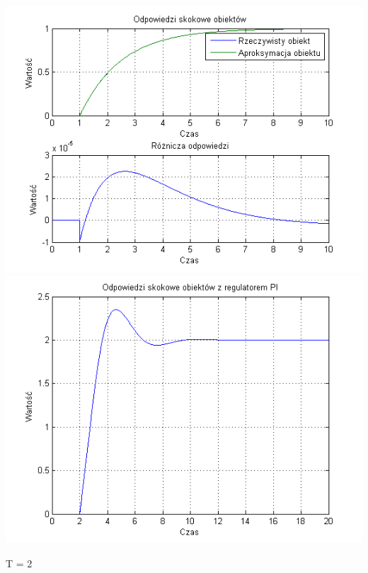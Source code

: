 \documentclass[10pt,a4paper]{article}
\begin{document}
\begin{center}
\includegraphics[scale=1]{images/jeden/skrypt_19.png}\\
\includegraphics[scale=1]{images/jeden/skrypt_20.png}\\
\end{center}
\newpage
T = 2
\end{document}
